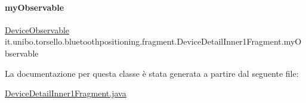\hypertarget{classit_1_1unibo_1_1torsello_1_1bluetoothpositioning_1_1fragment_1_1DeviceDetailInner1Fragment_a237134f174fd95371d0a7725b9a81183_a237134f174fd95371d0a7725b9a81183}{}\label{classit_1_1unibo_1_1torsello_1_1bluetoothpositioning_1_1fragment_1_1DeviceDetailInner1Fragment_a237134f174fd95371d0a7725b9a81183_a237134f174fd95371d0a7725b9a81183} 
\paragraph{\texorpdfstring{my\+Observable}{myObservable}}
{\footnotesize\ttfamily \hyperlink{classit_1_1unibo_1_1torsello_1_1bluetoothpositioning_1_1observables_1_1DeviceObservable}{Device\+Observable} it.\+unibo.\+torsello.\+bluetoothpositioning.\+fragment.\+Device\+Detail\+Inner1\+Fragment.\+my\+Observable\hspace{0.3cm}{\ttfamily [private]}}



La documentazione per questa classe è stata generata a partire dal seguente file\+:\begin{DoxyCompactItemize}
\item 
\hyperlink{DeviceDetailInner1Fragment_8java}{Device\+Detail\+Inner1\+Fragment.\+java}\end{DoxyCompactItemize}
